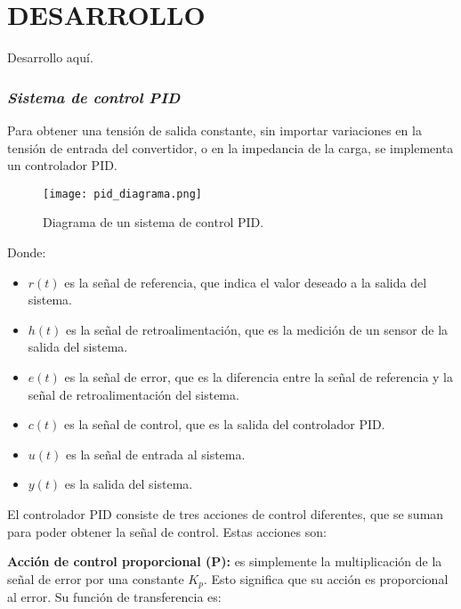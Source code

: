 \section*{\large{DESARROLLO}}
\vspace{-0.25cm}
\justifying

Desarrollo aquí.



\subsubsection*{\it{Sistema de control PID}}
\vspace{-0.25cm}
Para obtener una tensión de salida constante, sin importar variaciones en la tensión de entrada del
convertidor, o en la impedancia de la carga, se implementa un controlador PID.

\begin{figure}[H]
    \centering
    \texttt{[image: pid\_diagrama.png]}
    \vspace{-0.25cm}
    \caption{Diagrama de un sistema de control PID. \parencite{PICUINO}}
    \label{fig:pid_diagrama}
\end{figure}
\vspace{-0.5cm}

Donde:
\begin{itemize}[noitemsep]
    \item $r(t)$ es la señal de referencia, que indica el valor deseado a la salida del sistema.
    \item $h(t)$ es la señal de retroalimentación, que es la medición de un sensor de la salida del sistema.
    \item $e(t)$ es la señal de error, que es la diferencia entre la señal de referencia y la señal de
          retroalimentación del sistema.
    \item $c(t)$ es la señal de control, que es la salida del controlador PID.
    \item $u(t)$ es la señal de entrada al sistema.
    \item $y(t)$ es la salida del sistema.
\end{itemize}

El controlador PID consiste de tres acciones de control diferentes, que se suman para poder
obtener la señal de control. Estas acciones son:

\textbf{Acción de control proporcional (P):} es simplemente la multiplicación de la señal de error por
una constante $K_p$. Esto significa que su acción es proporcional al error. Su función de transferencia es:

